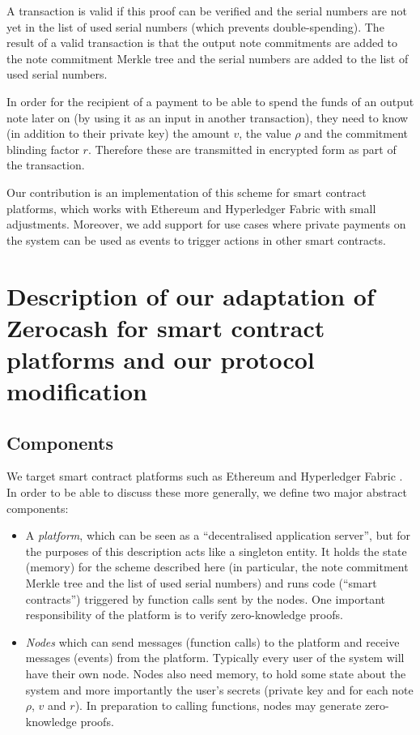 \documentclass{article}
\begin{document}
A transaction is valid if this proof can be verified and the serial numbers are not yet in the list of used serial numbers (which prevents double-spending). The result of a valid transaction is that the output note commitments are added to the note commitment Merkle tree and the serial numbers are added to the list of used serial numbers.

In order for the recipient of a payment to be able to spend the funds of an output note later on (by using it as an input in another transaction), they need to know (in addition to their private key) the amount $v$, the value $\rho$ and the commitment blinding factor $r$. Therefore these are transmitted in encrypted form as part of the transaction.

Our contribution is an implementation of this scheme for smart contract platforms, which works with Ethereum and Hyperledger Fabric with small adjustments. Moreover, we add support for use cases where private payments on the system can be used as events to trigger actions in other smart contracts.

\section{Description of our adaptation of Zerocash for smart contract platforms and our protocol modification}

\subsection{Components} \label{components}
We target smart contract platforms such as Ethereum \cite{ethereum} and Hyperledger Fabric \cite{fabric}. In order to be able to discuss these more generally, we define two major abstract components:
\begin{itemize}
    \item A \textit{platform}, which can be seen as a ``decentralised application server'', but for the purposes of this description acts like a singleton entity. It holds the state (memory) for the scheme described here (in particular, the note commitment Merkle tree and the list of used serial numbers) and runs code (``smart contracts'') triggered by function calls sent by the nodes. One important responsibility of the platform is to verify zero-knowledge proofs. 
    \item \textit{Nodes} which can send messages (function calls) to the platform and receive messages (events) from the platform. Typically every user of the system will have their own node. Nodes also need memory, to hold some state about the system and more importantly the user's secrets (private key and for each note $\rho$, $v$ and $r$). In preparation to calling functions, nodes may generate zero-knowledge proofs.
\end{itemize}
\end{document}
